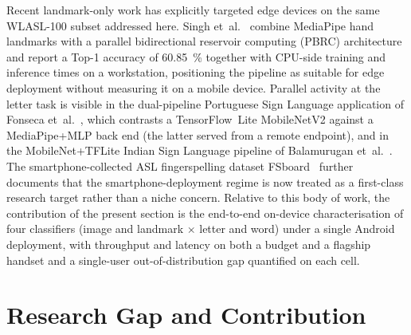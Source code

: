 Recent landmark-only work has explicitly targeted edge devices on the
same WLASL-100 subset addressed here. Singh
et~al.~\cite{singh2026pbrc} combine MediaPipe hand landmarks with a
parallel bidirectional reservoir computing (PBRC) architecture and
report a Top-1 accuracy of \SI{60.85}{\percent} together with CPU-side
training and inference times on a workstation, positioning the
pipeline as suitable for edge deployment without measuring it on a
mobile device. Parallel activity at the letter task is visible in the
dual-pipeline Portuguese Sign Language application of Fonseca
et~al.~\cite{fonseca2025lgp}, which contrasts a TensorFlow~Lite
MobileNetV2 against a MediaPipe+MLP back end (the latter served from a
remote endpoint), and in the MobileNet+TFLite Indian Sign Language
pipeline of Balamurugan et~al.~\cite{balamurugan2025isl}. The
smartphone-collected ASL fingerspelling dataset
FSboard~\cite{georg2024fsboard} further documents that the
smartphone-deployment regime is now treated as a first-class research
target rather than a niche concern. Relative to this body of work,
the contribution of the present section is the end-to-end on-device
characterisation of four classifiers (image and landmark $\times$
letter and word) under a single Android deployment, with throughput
and latency on both a budget and a flagship handset and a single-user
out-of-distribution gap quantified on each cell.

\section{Research Gap and Contribution}
\label{sec:related-position}

